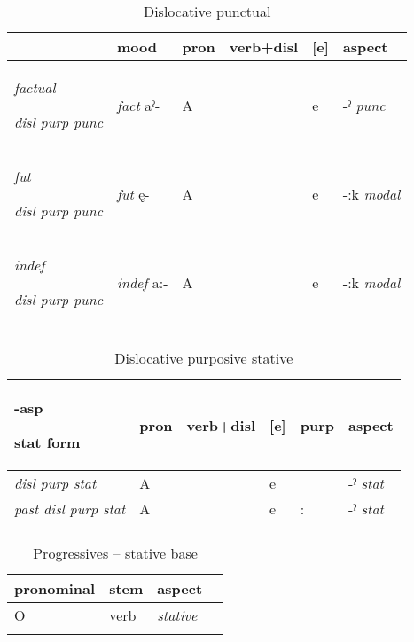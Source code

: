\begin{table}
\caption{Dislocative punctual}
\label{tab:1:dislpunc}
\scriptsize{
\begin{tabularx}{\textwidth}{XXXXXX}
\lsptoprule
& mood & pron & verb+disl & [e] & aspect \\
\midrule
{\itshape factual} 

{\itshape disl purp punc}

& \textit{fact} aˀ- & A &  & e & {}-ˀ \textit{punc}\\
{\itshape fut} 

{\itshape disl purp punc}

& \textit{fut} ę- & A &  & e & {}-:k \textit{modal}\\
{\itshape indef} 

{\itshape disl purp punc}

& \textit{indef} a:- & A &  & e & {}-:k \textit{modal}\\
\lspbottomrule
\end{tabularx}}
\end{table}

\lipsum[1-4]


\begin{table}
\caption{Dislocative purposive stative}
\label{tab:1:dislstat}
\scriptsize{
\begin{tabularx}{\textwidth}{XXXXXX}
\lsptoprule
3-asp 

stat form & pron & verb+disl & [e] & purp & aspect\\
\midrule
{\itshape disl purp stat}

& A &  & e &  & {}-ˀ \textit{stat}\\
{\itshape past disl purp stat} & A &  & e & : & {}-ˀ \textit{stat}\\
\lspbottomrule
\end{tabularx}}
\end{table}

\lipsum[1-1]

\begin{table}
\caption{Progressives – stative base}
\label{tab:1:progstatbase}
\scriptsize{
\begin{tabularx}{.66\textwidth}{XXXX}
\lsptoprule
pronominal & stem & aspect\\
\midrule
O & verb & {\itshape stative}\\
\lspbottomrule
\end{tabularx}}
\end{table}

